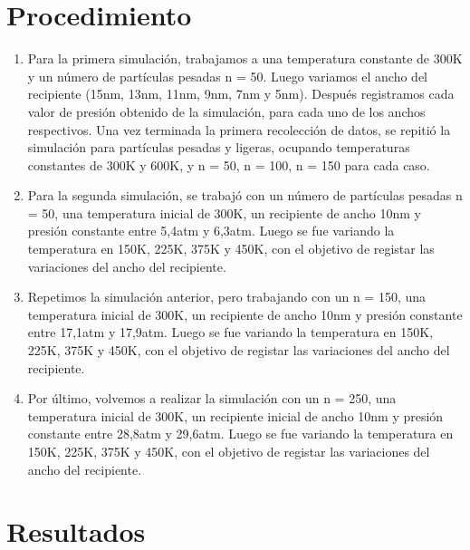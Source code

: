 \documentclass[a4paper, 12p]{article}
\begin{document}
\section{Procedimiento}
\begin{enumerate}
    \item Para la primera simulación, trabajamos a una temperatura constante de 300K y un número de partículas pesadas n = 50. Luego variamos el ancho del recipiente (15nm, 13nm, 11nm,
    9nm, 7nm y 5nm). Después registramos cada valor de presión obtenido de la simulación, para cada
    uno de los anchos respectivos.
    Una vez terminada la primera recolección de datos, se repitió la simulación para partículas pesadas y ligeras, ocupando temperaturas constantes de 300K y 600K, y n = 50, n = 100, n = 150
    para cada caso. 

    \item Para la segunda simulación, se trabajó con un número de partículas pesadas n = 50, una
    temperatura inicial de 300K, un recipiente de ancho 10nm  y presión constante entre 5,4atm y 6,3atm.
    Luego se fue variando la temperatura en 150K, 225K, 375K y 450K, con el objetivo de registar las variaciones del ancho del recipiente.
    

    \item   Repetimos la simulación anterior, pero trabajando con un n = 150,  una temperatura inicial de 300K,  un recipiente de ancho 10nm y presión constante entre 17,1atm y 17,9atm. 
    Luego se fue variando la temperatura en 150K, 225K, 375K y 450K, con el objetivo de registar las variaciones del ancho del recipiente. 
    
    \item  Por último, volvemos a realizar la simulación con un n = 250, una temperatura inicial de 300K, un
    recipiente inicial de ancho 10nm y presión constante entre 28,8atm y 29,6atm.
    Luego se fue variando la temperatura en 150K, 225K, 375K y 450K, con el objetivo de registar las variaciones del ancho del recipiente.
   
    
    
\end{enumerate}









\section{Resultados}
\end{document}
